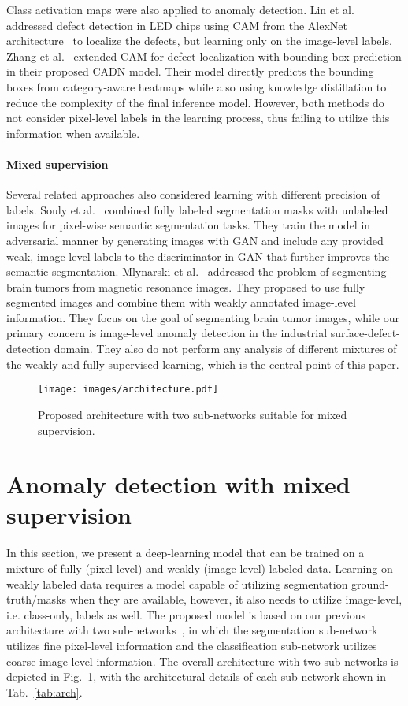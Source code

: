 Class activation maps were also applied to anomaly detection. Lin et al.~\cite{Lin2018} addressed defect detection in LED chips using CAM from the AlexNet architecture~\cite{Zhou2015} to localize the defects, but learning only on the image-level labels. Zhang et al.~\cite{CADN} extended CAM for defect localization with bounding box prediction in their proposed CADN model. Their model directly predicts the bounding boxes from category-aware heatmaps while also using knowledge distillation to reduce the complexity of the final inference model. However, both methods do not consider pixel-level labels in the learning process, thus failing to utilize this information when available.

\paragraph{Mixed supervision} Several related approaches also considered learning with different precision of labels. Souly et al.~\cite{Souly2017} combined fully labeled segmentation masks with unlabeled images for pixel-wise semantic segmentation tasks. They train the model in adversarial manner by generating images with GAN and include any provided weak, image-level labels to the discriminator in GAN that further improves the semantic segmentation. Mlynarski et al.~\cite{Mlynarski2019} addressed the problem of segmenting brain tumors from magnetic resonance images. They proposed to use fully segmented images and combine them with weakly annotated image-level information. 
They focus on the goal of segmenting brain tumor images, while our primary concern is image-level anomaly detection in the industrial surface-defect-detection domain. They also do not perform any analysis of different mixtures of the weakly and fully supervised learning, which is the central point of this paper.

\begin{figure}
    \centering
    \texttt{[image: images/architecture.pdf]}
    \caption{Proposed architecture with two sub-networks suitable for mixed supervision.} 
  \label{fig:arch}
\end{figure}

\section{Anomaly detection with mixed supervision} \label{sec:method}

In this section, we present a deep-learning model that can be trained on a mixture of fully (pixel-level) and weakly (image-level) labeled data.
Learning on weakly labeled data requires a model capable of utilizing segmentation ground-truth/masks when they are available, however, it also needs to utilize image-level, i.e. class-only, labels as well.
The proposed model is based on our previous architecture with two sub-networks~\cite{Tabernik2019JIM, bozic2020}, in which the segmentation sub-network utilizes fine pixel-level information and the classification sub-network utilizes coarse image-level information.
The overall architecture with two sub-networks is depicted in Fig.~\ref{fig:arch}, with the architectural details of each sub-network shown in Tab.~\ref{tab:arch}.


